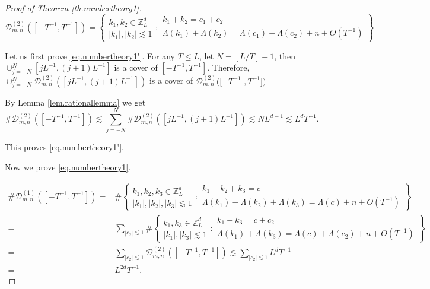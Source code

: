 \begin{proof}[Proof of Theorem \ref{th.numbertheory1}]
\begin{equation}
    \mathcal{D}^{(2)}_{m,n}([-T^{-1},T^{-1} ])=\left
    \{\begin{matrix}
k_1,k_2\in\mathbb{Z}_L^d \\
|k_1|, |k_2|\lesssim 1
\end{matrix}
:
\begin{matrix}
k_1+ k_2=c_1+ c_{2} \\
\Lambda(k_1)+\Lambda(k_2)=\Lambda(c_1)+ \Lambda(c_2)+n+O(T^{-1})
\end{matrix}
\right\}
\end{equation}


Let us first prove \eqref{eq.numbertheory1'}. For any $T\le L$, let $N=[L/T]+1$, then $\cup_{j=-N}^N [jL^{-1}, (j+1)L^{-1}]$ is a cover of $[-T^{-1}, T^{-1}]$. Therefore, $\cup_{j=-N}^N\mathcal{D}^{(2)}_{m,n}([jL^{-1}, (j+1)L^{-1}])$ is a cover of $\mathcal{D}^{(2)}_{m,n}([-T^{-1}$ $,T^{-1} ])$

By Lemma \ref{lem.rationallemma} we get 
\begin{equation}\label{eq.thrationalexpand}
    \#\mathcal{D}^{(2)}_{m,n}([-T^{-1},T^{-1} ])\lesssim \sum_{j=-N}^N\#\mathcal{D}^{(2)}_{m,n}([jL^{-1}, (j+1)L^{-1}])\lesssim NL^{d-1}\lesssim L^dT^{-1}.
\end{equation}

This proves \eqref{eq.numbertheory1'}.

Now we prove \eqref{eq.numbertheory1}. 

\begin{equation}\label{eq.thrationalexpandlong}
\begin{split}
\#\mathcal{D}^{(1)}_{m,n}([-T^{-1},T^{-1} ])=&\#\left\{\begin{matrix}
k_1,k_2,k_3\in\mathbb{Z}_L^d \\
|k_1|,|k_2|,|k_3|\lesssim 1
\end{matrix}
:
\begin{matrix}
k_1-k_2+k_3=c \\
\Lambda(k_1)-\Lambda(k_2)+\Lambda(k_3)=\Lambda(c)+n+O(T^{-1})
\end{matrix}
\right\}
\\
=&\sum_{|c_2|\lesssim 1} \#\left\{\begin{matrix}
k_1,k_3\in\mathbb{Z}_L^d \\
|k_1|,|k_3|\lesssim 1
\end{matrix}
:
\begin{matrix}
k_1+k_3=c+c_2 \\
\Lambda(k_1)+\Lambda(k_3)=\Lambda(c)+\Lambda(c_2)+n+O(T^{-1})
\end{matrix}
\right\}
\\
= &  \sum_{|c_2|\lesssim 1} \mathcal{D}^{(2)}_{m,n}([-T^{-1},T^{-1} ])\lesssim \sum_{|c_2|\lesssim 1} L^{d} T^{-1}
\\
=&L^{2d} T^{-1}.
\end{split}
\end{equation}


\end{proof}
